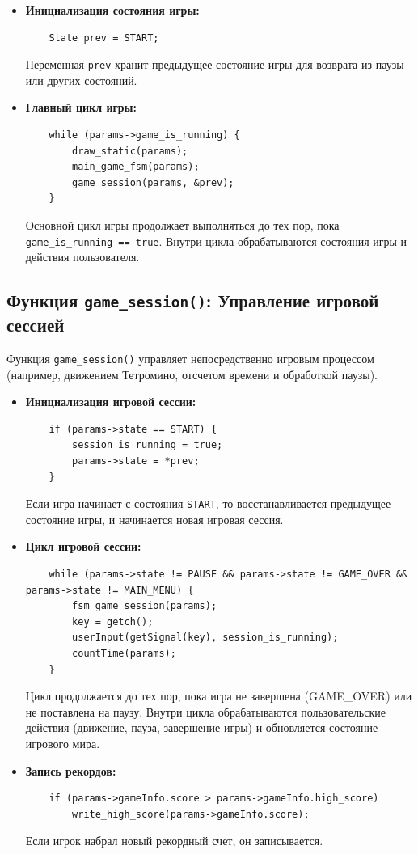 \documentclass{article}
\begin{document}
\begin{itemize}
    \item \textbf{Инициализация состояния игры:}
    \begin{verbatim}
    State prev = START;
    \end{verbatim}
    Переменная \texttt{prev} хранит предыдущее состояние игры для возврата из паузы или других состояний.

    \item \textbf{Главный цикл игры:}
    \begin{verbatim}
    while (params->game_is_running) {
        draw_static(params);
        main_game_fsm(params);
        game_session(params, &prev);
    }
    \end{verbatim}
    Основной цикл игры продолжает выполняться до тех пор, пока \texttt{game\_is\_running == true}. Внутри цикла обрабатываются состояния игры и действия пользователя.
\end{itemize}

\subsection{Функция \texttt{game\_session()}: Управление игровой сессией}

Функция \texttt{game\_session()} управляет непосредственно игровым процессом (например, движением Тетромино, отсчетом времени и обработкой паузы).

\begin{itemize}
    \item \textbf{Инициализация игровой сессии:}
    \begin{verbatim}
    if (params->state == START) {
        session_is_running = true;
        params->state = *prev;
    }
    \end{verbatim}
    Если игра начинает с состояния \texttt{START}, то восстанавливается предыдущее состояние игры, и начинается новая игровая сессия.
    
    \item \textbf{Цикл игровой сессии:}
    \begin{verbatim}
    while (params->state != PAUSE && params->state != GAME_OVER && params->state != MAIN_MENU) {
        fsm_game_session(params);
        key = getch();
        userInput(getSignal(key), session_is_running);
        countTime(params);
    }
    \end{verbatim}
    Цикл продолжается до тех пор, пока игра не завершена (GAME\_OVER) или не поставлена на паузу. Внутри цикла обрабатываются пользовательские действия (движение, пауза, завершение игры) и обновляется состояние игрового мира.
    
    \item \textbf{Запись рекордов:}
    \begin{verbatim}
    if (params->gameInfo.score > params->gameInfo.high_score)
        write_high_score(params->gameInfo.score);
    \end{verbatim}
    Если игрок набрал новый рекордный счет, он записывается.
\end{itemize}
\end{document}
